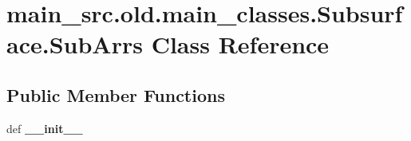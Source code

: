 \hypertarget{classmain__src_8old_1_1main__classes_1_1Subsurface_1_1SubArrs}{\section{main\-\_\-src.\-old.\-main\-\_\-classes.\-Subsurface.\-Sub\-Arrs Class Reference}
\label{classmain__src_8old_1_1main__classes_1_1Subsurface_1_1SubArrs}
}
\subsection*{Public Member Functions}
\begin{DoxyCompactItemize}
\item 
\hypertarget{classmain__src_8old_1_1main__classes_1_1Subsurface_1_1SubArrs_ad70ed4062a61809ad92ce6d1ce4705b5}{def {\bfseries \-\_\-\-\_\-init\-\_\-\-\_\-}}\label{classmain__src_8old_1_1main__classes_1_1Subsurface_1_1SubArrs_ad70ed4062a61809ad92ce6d1ce4705b5}

\end{DoxyCompactItemize}
